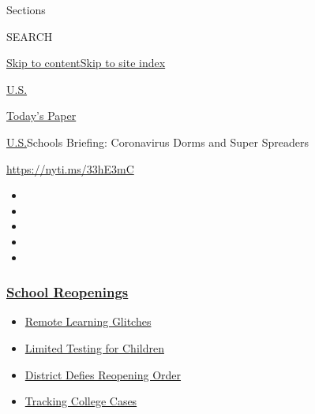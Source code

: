 Sections

SEARCH

\protect\hyperlink{site-content}{Skip to
content}\protect\hyperlink{site-index}{Skip to site index}

\href{https://www.nytimes3xbfgragh.onion/section/us}{U.S.}

\href{https://myaccount.nytimes3xbfgragh.onion/auth/login?response_type=cookie\&client_id=vi}{}

\href{https://www.nytimes3xbfgragh.onion/section/todayspaper}{Today's
Paper}

\href{/section/us}{U.S.}\textbar{}Schools Briefing: Coronavirus Dorms
and Super Spreaders

\url{https://nyti.ms/33hE3mC}

\begin{itemize}
\item
\item
\item
\item
\item
\end{itemize}

\hypertarget{school-reopenings}{%
\subsubsection{\texorpdfstring{\href{https://www.nytimes3xbfgragh.onion/spotlight/schools-reopening?name=styln-coronavirus-schools-reopening\&region=TOP_BANNER\&block=storyline_menu_recirc\&action=click\&pgtype=Article\&impression_id=db1065f0-f4be-11ea-90d3-2f0ff35b997f\&variant=undefined}{School
Reopenings}}{School Reopenings}}\label{school-reopenings}}

\begin{itemize}
\tightlist
\item
  \href{https://www.nytimes3xbfgragh.onion/2020/09/08/us/school-districts-cyberattacks-glitches.html?name=styln-coronavirus-schools-reopening\&region=TOP_BANNER\&block=storyline_menu_recirc\&action=click\&pgtype=Article\&impression_id=db1065f1-f4be-11ea-90d3-2f0ff35b997f\&variant=undefined}{Remote
  Learning Glitches}
\item
  \href{https://www.nytimes3xbfgragh.onion/2020/09/08/upshot/children-testing-shortfalls-virus.html?name=styln-coronavirus-schools-reopening\&region=TOP_BANNER\&block=storyline_menu_recirc\&action=click\&pgtype=Article\&impression_id=db1065f2-f4be-11ea-90d3-2f0ff35b997f\&variant=undefined}{Limited
  Testing for Children}
\item
  \href{https://www.nytimes3xbfgragh.onion/2020/09/10/us/des-moines-school-opening-coronavirus.html?name=styln-coronavirus-schools-reopening\&region=TOP_BANNER\&block=storyline_menu_recirc\&action=click\&pgtype=Article\&impression_id=db1065f3-f4be-11ea-90d3-2f0ff35b997f\&variant=undefined}{District
  Defies Reopening Order}
\item
  \href{https://www.nytimes3xbfgragh.onion/interactive/2020/us/covid-college-cases-tracker.html?name=styln-coronavirus-schools-reopening\&region=TOP_BANNER\&block=storyline_menu_recirc\&action=click\&pgtype=Article\&impression_id=db1065f4-f4be-11ea-90d3-2f0ff35b997f\&variant=undefined}{Tracking
  College Cases}
\end{itemize}

